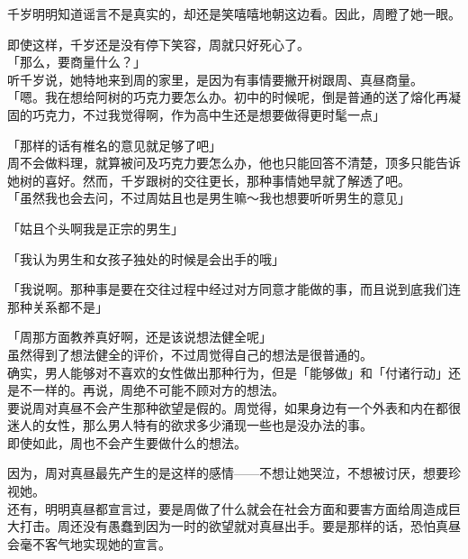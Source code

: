千岁明明知道谣言不是真实的，却还是笑嘻嘻地朝这边看。因此，周瞪了她一眼。

即使这样，千岁还是没有停下笑容，周就只好死心了。\\

「那么，要商量什么？」\\

听千岁说，她特地来到周的家里，是因为有事情要撇开树跟周、真昼商量。\\

「嗯。我在想给阿树的巧克力要怎么办。初中的时候呢，倒是普通的送了熔化再凝固的巧克力，不过我觉得啊，作为高中生还是想要做得更时髦一点」

「那样的话有椎名的意见就足够了吧」\\

周不会做料理，就算被问及巧克力要怎么办，他也只能回答不清楚，顶多只能告诉她树的喜好。然而，千岁跟树的交往更长，那种事情她早就了解透了吧。\\

「虽然我也会去问，不过周姑且也是男生嘛～我也想要听听男生的意见」

「姑且个头啊我是正宗的男生」

「我认为男生和女孩子独处的时候是会出手的哦」

「我说啊。那种事是要在交往过程中经过对方同意才能做的事，而且说到底我们连那种关系都不是」

「周那方面教养真好啊，还是该说想法健全呢」\\

虽然得到了想法健全的评价，不过周觉得自己的想法是很普通的。\\

确实，男人能够对不喜欢的女性做出那种行为，但是「能够做」和「付诸行动」还是不一样的。再说，周绝不可能不顾对方的想法。\\

要说周对真昼不会产生那种欲望是假的。周觉得，如果身边有一个外表和内在都很迷人的女性，那么男人特有的欲求多少涌现一些也是没办法的事。\\

即使如此，周也不会产生要做什么的想法。

因为，周对真昼最先产生的是这样的感情——不想让她哭泣，不想被讨厌，想要珍视她。\\

还有，明明真昼都宣言过，要是周做了什么就会在社会方面和要害方面给周造成巨大打击。周还没有愚蠢到因为一时的欲望就对真昼出手。要是那样的话，恐怕真昼会毫不客气地实现她的宣言。\\

